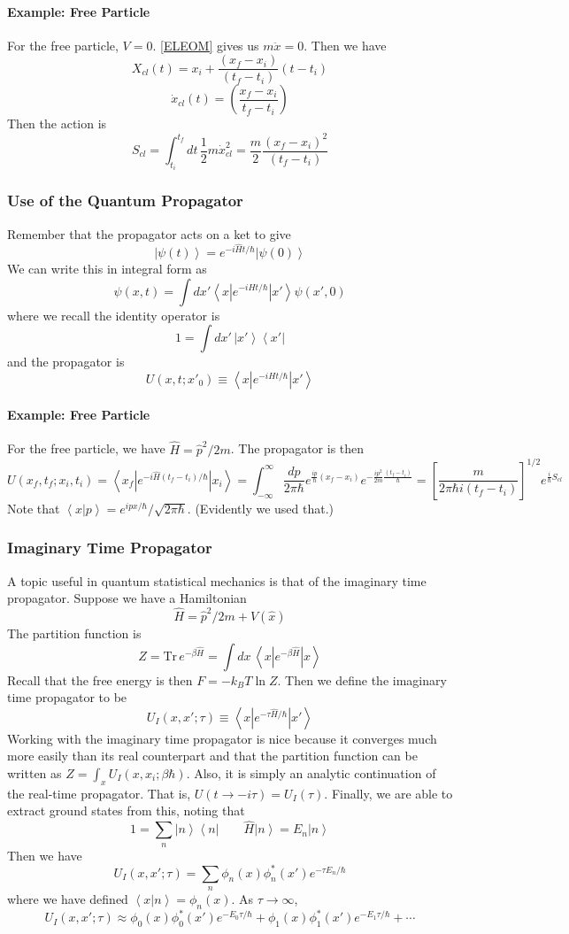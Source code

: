 \documentclass{article}
\begin{document}
	\paragraph{Example: Free Particle} For the free particle, $V=0$. \eqref{ELEOM} gives us $m\ddot{x}=0$. Then we have
	$$X_{cl}(t)=x_i+\frac{(x_f-x_i)}{(t_f-t_i)}(t-t_i)$$
	$$\dot{x}_{cl}(t)=\left(\frac{x_f-x_i}{t_f-t_i}\right)$$
	Then the action is
	$$S_{cl}=\int_{t_i}^{t_f}dt\,\frac{1}{2}m\dot{x}^2_{cl}=\frac{m}{2}\frac{(x_f-x_i)^2}{(t_f-t_i)}$$ 
	\subsubsection{Use of the Quantum Propagator}
	Remember that the propagator acts on a ket to give
	$$\left|\psi(t)\right>=e^{-i\hat{H}t/\hbar}\left|\psi(0)\right>$$
	We can write this in integral form as
	$$\psi(x,t)=\int dx'\left<x\left|e^{-iHt/\hbar}\right|x'\right>\psi(x',0)$$
	where we recall the identity operator is
	$$1=\int dx'\,\left|x'\right>\left<x'\right|$$
	and the propagator is
	$$U(x,t;x'_0)\equiv \left<x\left|e^{-iHt/\hbar}\right|x'\right>$$
	\paragraph{Example: Free Particle} For the free particle, we have $\hat{H}=\hat{p}^2/2m$. The propagator is then
	$$U(x_f,t_f;x_i,t_i)=\left<x_f\left|e^{-i\hat{H}(t_f-t_i)/\hbar}\right|x_i\right>=\int_{-\infty}^\infty \frac{dp}{2\pi\hbar}e^{\frac{ip}{\hbar}(x_f-x_i)}e^{-\frac{ip^2}{2m}\frac{(t_f-t_i)}{\hbar}}=\left[\frac{m}{2\pi\hbar i(t_f-t_i)}\right]^{1/2}e^{\frac{i}{\hbar}S_{cl}}$$
	Note that $\left<x|p\right>=e^{ipx/\hbar}/\sqrt{2\pi\hbar}$. (Evidently we used that.)
	\subsubsection{Imaginary Time Propagator}
	A topic useful in quantum statistical mechanics is that of the imaginary time propagator. Suppose we have a Hamiltonian
	$$\hat{H}=\hat{p}^2/2m+V(\hat{x})$$
	The partition function is 
	$$Z=\mathrm{Tr}\, e^{-\beta\hat{H}}=\int dx\,\left<x\left|e^{-\beta\hat{H}}\right|x\right>$$
	Recall that the free energy is then $F=-k_BT\ln Z$. Then we define the imaginary time propagator to be
	$$U_I(x,x';\tau)\equiv\left<x\left|e^{-\tau \hat{H}/\hbar}\right|x'\right>$$
	Working with the imaginary time propagator is nice because it converges much more easily than its real counterpart and that the partition function can be written as $Z=\int_x U_I(x,x_i;\beta\hbar)$. Also, it is simply an analytic continuation of the real-time propagator. That is, $U(t\to-i\tau)=U_I(\tau)$. Finally, we are able to extract ground states from this, noting that
	$$1=\sum_n\left|n\right>\left<n\right|\qquad \hat{H}\left|n\right>=E_n\left|n\right>$$
	Then we have
	$$U_I(x,x';\tau)=\sum_n \phi_n(x)\phi_n^*(x')e^{-\tau E_n/\hbar}$$
	where we have defined $\left<x|n\right>=\phi_n(x)$. As $\tau\to \infty$,
	$$U_I(x,x';\tau)\approx \phi_0(x)\phi_0^*(x')e^{-E_0\tau/\hbar}+\phi_1(x)\phi_1^*(x')e^{-E_1\tau/\hbar}+\cdots$$
	
	
	
	
	
\end{document}
